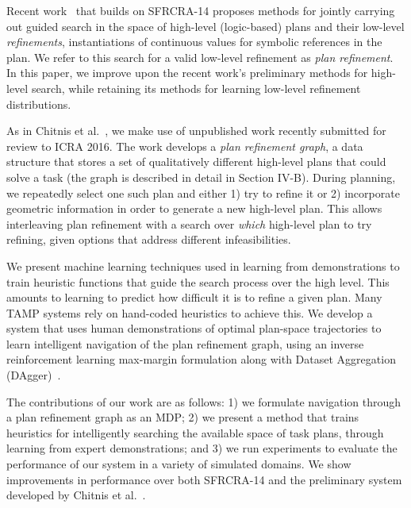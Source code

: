 Recent work~\cite{chitnis2015mlpc} that builds on SFRCRA-14 proposes
methods for jointly carrying out guided search in the space of
high-level (logic-based) plans and their low-level
\emph{refinements}, instantiations of continuous values for
symbolic references in the plan. We refer to this search for a valid low-level
refinement as \emph{plan refinement}. In this paper, we improve upon
the recent work's preliminary methods for high-level search, while retaining its methods
for learning low-level refinement distributions.

As in Chitnis et al.~\cite{chitnis2015mlpc}, we make use of unpublished work
recently submitted for review to ICRA 2016. The work develops
a \emph{plan refinement graph}, a data structure that stores a
set of qualitatively different high-level plans that could solve a task (the graph is
described in detail in Section IV-B).
During planning, we repeatedly select one such plan and either 1) try to
refine it or 2) incorporate geometric information in order to generate a new high-level
plan. This allows interleaving plan refinement with a
search over \emph{which} high-level plan to try refining, given options
that address different infeasibilities.

We present machine learning techniques used in learning from demonstrations
to train heuristic functions that guide the search process over the high level.
This amounts to learning to predict how difficult it is to refine a given plan.
Many TAMP systems rely on hand-coded heuristics to achieve this. We develop a system that uses human
demonstrations of optimal plan-space trajectories to learn intelligent navigation
of the plan refinement graph, using an inverse reinforcement learning
max-margin formulation along with Dataset Aggregation (DAgger)~\cite{ross2010dagger}.

The contributions of our work are as follows: 1) we formulate navigation through a plan
refinement graph as an MDP; 2) we present a method that trains
heuristics for intelligently searching the available space of task plans, through learning
from expert demonstrations; and 3)
we run experiments to evaluate the performance of our system in a
variety of simulated domains. We show improvements in performance over both SFRCRA-14
and the preliminary system developed by Chitnis et al.~\cite{chitnis2015mlpc}.
